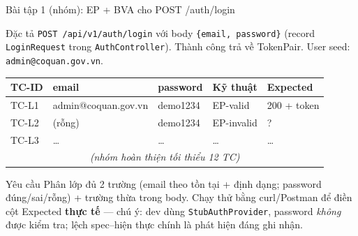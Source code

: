 \documentclass[aspectratio=169,12pt]{beamer}
\begin{document}
\begin{frame}[shrink=10]{Bài tập 1 (nhóm): EP + BVA cho POST /auth/login}
  \begin{block}{Đặc tả}
    \texttt{POST /api/v1/auth/login} với body \texttt{\{email, password\}}
    (record \texttt{LoginRequest} trong \texttt{AuthController}).
    Thành công trả về TokenPair. User seed: \texttt{admin@coquan.gov.vn}.
  \end{block}

  \vspace{0.15em}
  \begin{center}
  \scriptsize
  \setlength{\tabcolsep}{3pt}
  \begin{tabular}{p{1.2cm}p{3.4cm}p{2.0cm}p{2.2cm}p{1.6cm}}
    \toprule
    \textbf{TC-ID} & \textbf{email} & \textbf{password} & \textbf{Kỹ thuật} & \textbf{Expected} \\
    \midrule
    TC-L1 & admin@coquan.gov.vn & demo1234 & EP-valid & 200 + token \\
    TC-L2 & (rỗng) & demo1234 & EP-invalid & ? \\
    TC-L3 & \ldots & \ldots & \ldots & \ldots \\
    \multicolumn{5}{c}{\textit{(nhóm hoàn thiện tối thiểu 12 TC)}} \\
    \bottomrule
  \end{tabular}
  \end{center}

  \vspace{0.1em}
  \begin{alertblock}{Yêu cầu}
    \small Phân lớp đủ 2 trường (email theo tồn tại + định dạng; password
    đúng/sai/rỗng) + trường thừa trong body. Chạy thử bằng curl/Postman để
    điền cột Expected \textbf{thực tế} --- chú ý: dev dùng
    \texttt{StubAuthProvider}, password \emph{không} được kiểm tra; lệch
    spec--hiện thực chính là phát hiện đáng ghi nhận.
  \end{alertblock}
\end{frame}
\end{document}
